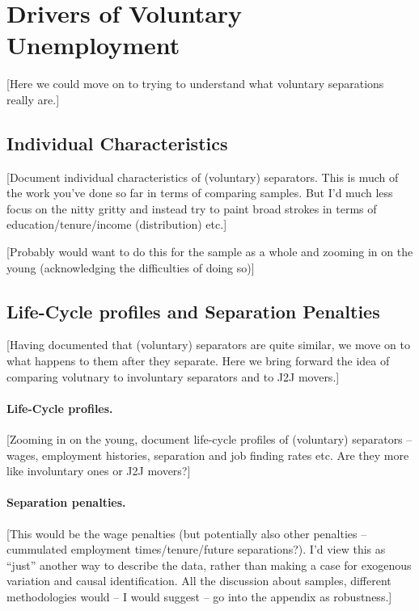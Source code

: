 \documentclass[12pt,a4paper]{article}
\begin{document}
\section{Drivers of Voluntary Unemployment}
[Here we could move on to trying to understand what voluntary separations really are.]

\subsection{Individual Characteristics}
[Document individual characteristics of (voluntary) separators. This is much of the work you've done so far in terms of comparing samples. But I'd much less focus on the nitty gritty and instead try to paint broad strokes in terms of education/tenure/income (distribution) etc.]

[Probably would want to do this for the sample as a whole and zooming in on the young (acknowledging the difficulties of doing so)]

\subsection{Life-Cycle profiles and Separation Penalties}
[Having documented that (voluntary) separators are quite similar, we move on to what happens to them after they separate. Here we bring forward the idea of comparing volutnary to involuntary separators and to J2J movers.]

\paragraph{Life-Cycle profiles.} [Zooming in on the young, document life-cycle profiles of (voluntary) separators -- wages, employment histories, separation and job finding rates etc. Are they more like involuntary ones or J2J movers?]

\paragraph{Separation penalties.} [This would be the wage penalties (but potentially also other penalties -- cummulated employment times/tenure/future separations?). I'd view this as ``just'' another way to describe the data, rather than making a case for exogenous variation and causal identification. All the discussion about samples, different methodologies would -- I would suggest -- go into the appendix as robustness.]
\end{document}
